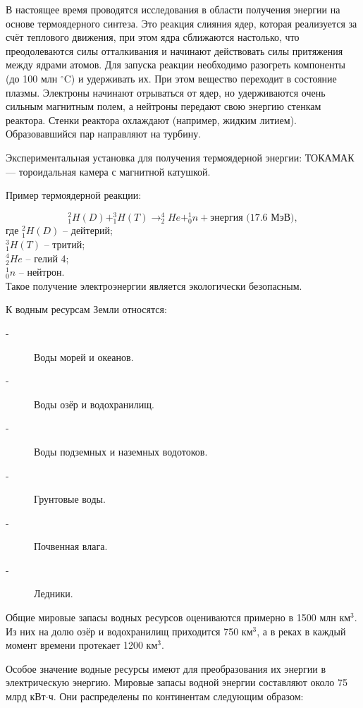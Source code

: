 В настоящее время проводятся исследования в области получения энергии на основе термоядерного синтеза. Это реакция слияния ядер, которая реализуется за счёт теплового движения, при этом ядра сближаются настолько, что преодолеваются силы отталкивания и начинают действовать силы притяжения между ядрами атомов. Для запуска реакции необходимо разогреть компоненты (до 100 млн $^\circ$C) и удерживать их. При этом вещество переходит в состояние плазмы. Электроны начинают отрываться от ядер, но удерживаются очень сильным магнитным полем, а нейтроны передают свою энергию стенкам реактора. Стенки реактора охлаждают (например, жидким литием). Образовавшийся пар направляют на турбину.

Экспериментальная установка для получения термоядерной энергии: ТОКАМАК --- тороидальная камера с магнитной катушкой.

Пример термоядерной реакции:

$$
 ^2_1 H(D) + ^3_1H(T) \rightarrow ^4_2 He + ^1_0 n + \text{энергия (17.6 МэВ)} ,
$$
где $^2_1 H(D)$ -- дейтерий; \\

$^3_1H(T)$ -- тритий; \\

$^4_2 He$ -- гелий 4; \\

$^1_0 n$ -- нейтрон. \\

Такое получение электроэнергии является экологически безопасным.

\vspace{1.0cm}

К водным ресурсам Земли относятся:
\begin{description}
\item[-] Воды морей и океанов.
\item[-] Воды озёр и водохранилищ.
\item[-] Воды подземных и наземных водотоков.
\item[-] Грунтовые воды.
\item[-] Почвенная влага.
\item[-] Ледники.
\end{description}

Общие мировые запасы водных ресурсов оцениваются примерно в 1500 млн км$^3$. Из них на долю озёр и водохранилищ приходится 750 км$^3$, а в реках в каждый момент времени протекает 1200 км$^3$. 

Особое значение водные ресурсы имеют для преобразования их энергии в электрическую энергию. Мировые запасы водной энергии составляют около 75 млрд кВт$\cdot$ч. Они распределены по континентам следующим образом:

